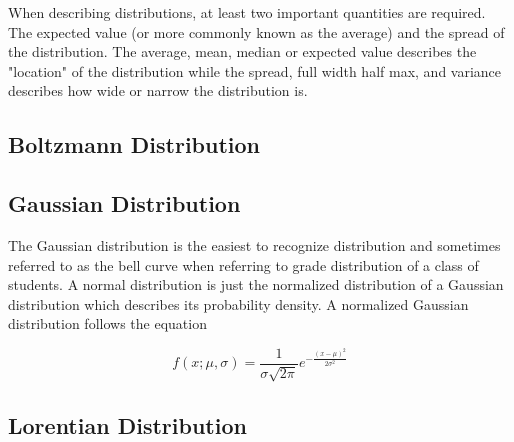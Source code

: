 \documentclass[11pt,a4paper]{book}
\newcommand{\imginput}[1]{} %
\begin{document}
		When describing distributions, at least two important quantities are required. The expected value (or more commonly known as the average) and the spread of the distribution. The average, mean, median or expected value describes the "location" of the distribution while the spread, full width half max, and variance describes how wide or narrow the distribution is. 
	
	\subsection{Boltzmann Distribution}
	
	\subsection{Gaussian Distribution}
		\label{subsec:Gaussian Distribution}
		The Gaussian distribution is the easiest to recognize distribution and sometimes referred to as the bell curve when referring to grade distribution of a class of students. A normal distribution is just the normalized distribution of a Gaussian distribution which describes its probability density. A normalized Gaussian distribution follows the equation
		
		\begin{equation}
		\label{eq:Gaussian Distribution}
		f(x;\mu,\sigma) = \dfrac{1}{\sigma \sqrt{2\pi}} e^{-\frac{(x-\mu)^2}{2\sigma^2}}
		\end{equation}
		
		\begin{figure} [!ht]
			\centering
			\def\svgwidth{\columnwidth}
			\resizebox{15cm}{!}{\imginput{images/Gaussian-Distribution-plots.pdf_tex}}
			\label{fig:Gaussian Distribution plots}
		\end{figure}
			
	\subsection{Lorentian Distribution}
		\label{subsec:Lorentian Distribution}
		
		\begin{figure} [!ht]
			\centering
			\def\svgwidth{\columnwidth}
			\resizebox{15cm}{!}{\imginput{images/lorentzian-distributions.pdf_tex}}
			\label{fig:lorentzian-distributions}
		\end{figure}
		
\end{document}

